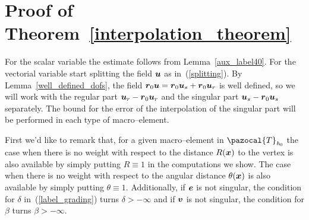 \section{Proof of Theorem~\ref{interpolation_theorem}}
{\color{Orange}For the scalar variable the estimate follows from Lemma~\ref{aux_label40}}.
For the vectorial variable start splitting the field $\boldsymbol{u}$ as in~(\ref{splitting}). By 
Lemma~\ref{well_defined_dofs}, the field $\boldsymbol{r}_{0}\boldsymbol{u} = \boldsymbol{r}_0\boldsymbol{u}_s + \boldsymbol{r}_0\boldsymbol{u}_r$ 
is well defined, so we will work 
with the regular part $\boldsymbol{u}_r - \boldsymbol{r}_0\boldsymbol{u}_r$ and the singular part $\boldsymbol{u}_s - \boldsymbol{r}_0\boldsymbol{u}_s$
separately. The bound for the error of the interpolation of the singular part will be 
performed in each type of macro--element.

First we'd like to remark that, for a given macro--element in 
$\pazocal{T}_{\textit{h}_0}$ the case when there is no weight with respect to 
the distance $R(\boldsymbol{x})$
to the vertex is also available by simply putting 
$R\equiv 1$ in the computations we show. The case when there is no weight with 
respect to the angular distance
$\theta(\boldsymbol{x})$ is also available by simply putting 
$\theta\equiv 1.$ Additionally, if $\boldsymbol{e}$ is not singular, the condition for 
$\delta$ in~(\ref{label_grading}) 
turns $\delta > -\infty$ and if $\boldsymbol{v}$ is not singular, the condition for $\beta$
turns $\beta > -\infty.$

